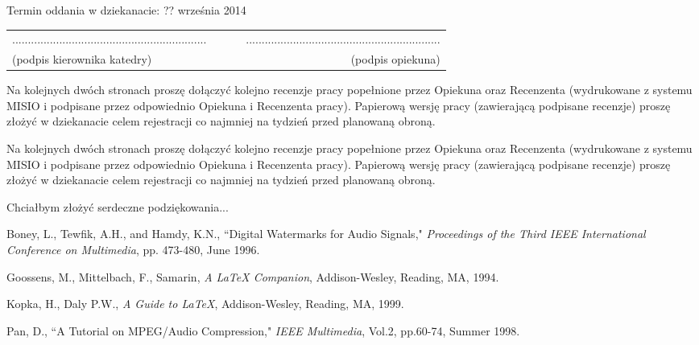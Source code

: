 \documentclass[a4paper,12pt]{book}
\newenvironment{dedication}
{
   \cleardoublepage
   \thispagestyle{empty}
   \vspace*{\stretch{10}}
   \hfill\begin{minipage}[t]{0.66\textwidth}
   \raggedright
}%
{
   \end{minipage}
   \vspace*{\stretch{3}}
   \clearpage
}
\begin{document}
\noindent
Termin oddania w dziekanacie: ?? września 2014\\[1cm]

\begin{center}
\begin{tabular}{lcr}
.............................................................. & ~~~ &
.............................................................. \\
(podpis kierownika katedry) & & (podpis opiekuna) \\
\end{tabular}
\end{center}

\newpage

\noindent
Na kolejnych dwóch stronach proszę dołączyć kolejno recenzje pracy popełnione przez Opiekuna oraz Recenzenta (wydrukowane z systemu MISIO i podpisane przez odpowiednio Opiekuna i Recenzenta pracy). Papierową wersję pracy (zawierającą podpisane recenzje) proszę złożyć w dziekanacie celem rejestracji co najmniej na tydzień przed planowaną obroną.

\newpage

\noindent
Na kolejnych dwóch stronach proszę dołączyć kolejno recenzje pracy popełnione przez Opiekuna oraz Recenzenta (wydrukowane z systemu MISIO i podpisane przez odpowiednio Opiekuna i Recenzenta pracy). Papierową wersję pracy (zawierającą podpisane recenzje) proszę złożyć w dziekanacie celem rejestracji co najmniej na tydzień przed planowaną obroną.

\begin{dedication}
Chciałbym złożyć serdeczne podziękowania...
\end{dedication}

\tableofcontents



%

\begin{thebibliography}{100} %
 
 Boney, L., Tewfik, A.H., and Hamdy, K.N., ``Digital 
Watermarks for Audio Signals," \emph{Proceedings of the Third IEEE 
International Conference on Multimedia}, pp. 473-480, June 1996. 
 
 Goossens, M., Mittelbach, F., Samarin, \emph{A LaTeX 
Companion}, Addison-Wesley, Reading, MA, 1994. 
 
 Kopka, H., Daly P.W., \emph{A Guide to LaTeX}, 
Addison-Wesley, Reading, MA, 1999. 
 
 Pan, D., ``A Tutorial on MPEG/Audio Compression," \emph{IEEE 
Multimedia}, Vol.2, pp.60-74, Summer 1998. 
 
\end{thebibliography} 
\end{document}

